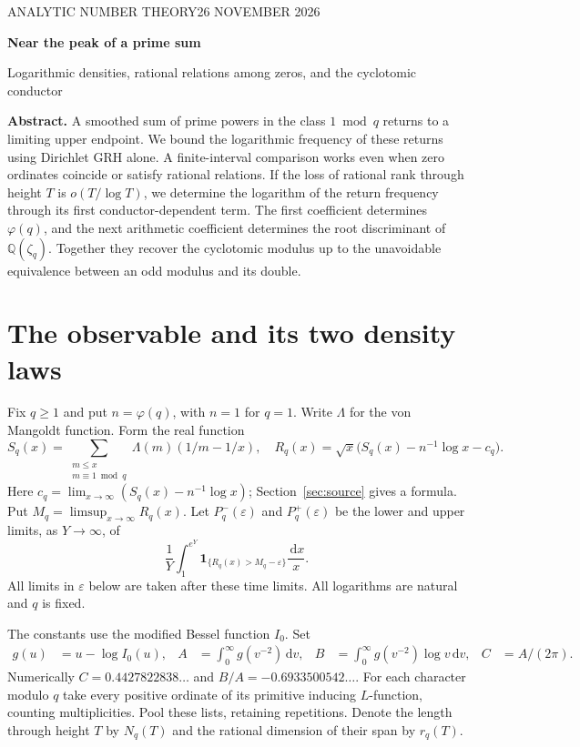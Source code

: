 \documentclass[11pt]{article}
\newcommand{\eps}{\varepsilon}\newcommand{\rd}{\operatorname{rd}}\newcommand{\EE}{\mathbb E}\newcommand{\PP}{\mathbb P}
\newcommand{\dd}{\,\mathrm d}\newcommand{\meas}{\operatorname{meas}}
\newcommand{\Q}{\mathbb Q}\newcommand{\R}{\mathbb R}
\begin{document}
\thispagestyle{plain}
{\small\sffamily\color{ink} ANALYTIC NUMBER THEORY\hfill 26 NOVEMBER 2026}\par\vspace{10pt}
{\huge\bfseries\color{ink} Near the peak of a prime sum}\par\vspace{4pt}
{\large Logarithmic densities, rational relations among zeros, and the cyclotomic conductor}\par\medskip
\noindent\textbf{Abstract.}
A smoothed sum of prime powers in the class $1\bmod q$ returns to a limiting upper endpoint. We bound the logarithmic frequency of these returns using Dirichlet GRH alone. A finite-interval comparison works even when zero ordinates coincide or satisfy rational relations. If the loss of rational rank through height $T$ is $o(T/\log T)$, we determine the logarithm of the return frequency through its first conductor-dependent term. The first coefficient determines $\varphi(q)$, and the next arithmetic coefficient determines the root discriminant of $\Q(\zeta_q)$. Together they recover the cyclotomic modulus up to the unavoidable equivalence between an odd modulus and its double.

\section{The observable and its two density laws}
Fix $q\ge1$ and put $n=\varphi(q)$, with $n=1$ for $q=1$. Write $\Lambda$ for the von Mangoldt function. Form the real function
\[
 S_q(x)=\sum_{\substack{m\le x\\m\equiv1\bmod q}}\Lambda(m)(1/m-1/x),\quad
 R_q(x)=\sqrt{x}\bigl(S_q(x)-n^{-1}\log x-c_q\bigr).
\]
Here $c_q=\lim_{x\to\infty}(S_q(x)-n^{-1}\log x)$; Section~\ref{sec:source} gives a formula. Put $M_q=\limsup_{x\to\infty}R_q(x)$. Let $P_q^-(\eps)$ and $P_q^+(\eps)$ be the lower and upper limits, as $Y\to\infty$, of
\[
 \frac1Y\int_1^{e^Y}\mathbf1_{\{R_q(x)>M_q-\eps\}}\frac{\dd x}{x}.
\]
All limits in $\eps$ below are taken after these time limits. All logarithms are natural and $q$ is fixed.

The constants use the modified Bessel function $I_0$. Set
\begin{align*}
 g(u)&=u-\log I_0(u),&
 A&=\int_0^\infty g(v^{-2})\dd v,&
 B&=\int_0^\infty g(v^{-2})\log v\dd v,& C&=A/(2\pi).
\end{align*}
Numerically $C=0.4427822838\ldots$ and $B/A=-0.6933500542\ldots$.
For each character modulo $q$ take every positive ordinate of its primitive inducing $L$-function, counting multiplicities. Pool these lists, retaining repetitions. Denote the length through height $T$ by $N_q(T)$ and the rational dimension of their span by $r_q(T)$.
\end{document}
